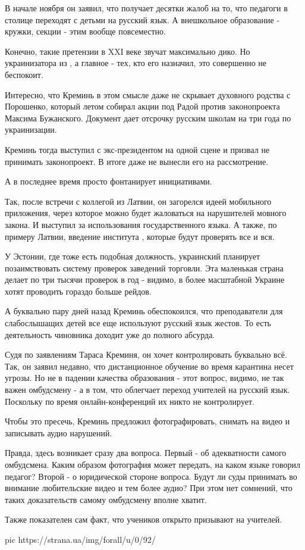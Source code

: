 В начале ноября он заявил, что получает десятки жалоб на то, что педагоги в
столице переходят с детьми на русский язык. А внешкольное образование - кружки,
секции -  этим вообще повсеместно. 

Конечно, такие претензии в XXІ веке звучат максимально дико. Но украинизатора
из , а главное - тех, кто его назначил, это совершенно не
беспокоит. 

Интересно, что Креминь в этом смысле даже не скрывает духовного родства с
Порошенко, который летом собирал акции под Радой против законопроекта  Максима Бужанского. Документ дает отсрочку русским школам на три года
по украинизации.

Креминь тогда выступил с экс-президентом на одной сцене и призвал не принимать
законопроект. В итоге  даже не вынесли его на рассмотрение. 

А в последнее время  просто фонтанирует инициативами.

Так, после встречи с коллегой из Латвии, он загорелся идеей мобильного
приложения, через которое можно будет жаловаться на нарушителей мовного закона.
И выступил за  использования государственного языка. А
также, по примеру Латвии, введение института , которые
будут проверять все и вся. 

У Эстонии, где тоже есть подобная должность, украинский 
планирует позаимствовать систему проверок заведений торговли. Эта маленькая
страна делает по три тысячи проверок в год - видимо, в более масштабной Украине
хотят проводить гораздо больше рейдов. 

А буквально пару дней назад Креминь обеспокоился, что преподаватели для
слабослышащих детей все еще используют русский язык жестов. То есть
деятельность чиновника доходит уже до полного абсурда. 

Судя по заявлениям Тараса Креминя, он хочет контролировать буквально всё. Так,
он заявил недавно, что дистанционное обучение во время карантина несет угрозы.
Но не в падении качества образования - этот вопрос, видимо, не так важен
омбудсмену - а в том, что облегчает переход учителей на русский язык. Поскольку
по время онлайн-конференций их никто не контролирует.

Чтобы это пресечь, Креминь предложил фотографировать, снимать на видео и
записывать аудио нарушений.

Правда, здесь возникает сразу два вопроса. Первый - об адекватности самого
омбудсмена. Каким образом фотография может передать, на каком языке говорил
педагог? Второй - о юридической стороне вопроса. Будут ли суды принимать во
внимание любительские видео и тем более аудио? При этом нет сомнений, что таких
доказательств самому омбудсмену вполне хватит.

Также показателен сам факт, что учеников открыто призывают  на
учителей. 

\ifcmt
pic https://strana.ua/img/forall/u/0/92/%
\fi
